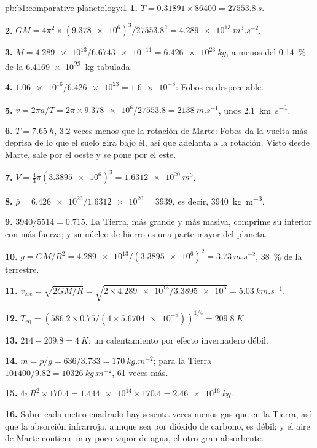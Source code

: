 \begin{solution}{pb:b1:comparative-planetology:1}
\textbf{1.} $T = 0.31891\times86400 = \qty{27553.8}{s}$.

\textbf{2.} $GM = 4\pi^2\times(\num{9.378e6})^3/\num{27553.8}^2 =
\qty{4.289e13}{m^3.s^{-2}}$.

\textbf{3.} $M = \num{4.289e13}/\num{6.6743e-11} = \qty{6.426e23}{kg}$,
a menos del \qty{0.14}{\percent} de la \qty{6.4169e23}{kg} tabulada.

\textbf{4.} $\num{1.06e16}/\num{6.426e23} = \num{1.6e-8}$: Fobos es despreciable.

\textbf{5.} $v = 2\pi a/T = 2\pi\times\num{9.378e6}/27553.8 =
\qty{2138}{m.s^{-1}}$, unos \qty{2.1}{km.s^{-1}}.

\textbf{6.} $T = \qty{7.65}{h}$, 3.2 veces menos que la rotación de Marte: Fobos da la vuelta
más deprisa de lo que el suelo gira bajo él, así que adelanta a la rotación. Visto desde Marte,
sale por el oeste y se pone por el este.

\textbf{7.} $V = \tfrac43\pi(\num{3.3895e6})^3 = \qty{1.6312e20}{m^3}$.

\textbf{8.} $\bar\rho = \num{6.426e23}/\num{1.6312e20} = 3939$, es decir,
\qty{3940}{kg.m^{-3}}.

\textbf{9.} $3940/5514 = 0.715$. La Tierra, más grande y más masiva, comprime su interior con
más fuerza; y su núcleo de hierro es una parte mayor del planeta.

\textbf{10.} $g = GM/R^2 = \num{4.289e13}/(\num{3.3895e6})^2 =
\qty{3.73}{m.s^{-2}}$, \qty{38}{\percent} de la terrestre.

\textbf{11.} $v_\mathrm{esc} = \sqrt{2GM/R} = \sqrt{2\times\num{4.289e13}/
\num{3.3895e6}} = \qty{5.03}{km.s^{-1}}$.

\textbf{12.} $T_\mathrm{eq} = (586.2\times0.75/(4\times\num{5.6704e-8}))^{1/4}
= \qty{209.8}{K}$.

\textbf{13.} $214 - 209.8 = \qty{4}{K}$: un calentamiento por efecto invernadero débil.

\textbf{14.} $m = p/g = 636/3.733 = \qty{170}{kg.m^{-2}}$; para la Tierra
$101400/9.82 = \qty{10326}{kg.m^{-2}}$, 61 veces más.

\textbf{15.} $4\pi R^2\times170.4 = \num{1.444e14}\times170.4 =
\qty{2.46e16}{kg}$.

\textbf{16.} Sobre cada metro cuadrado hay sesenta veces menos gas que en la Tierra, así que la
absorción infrarroja, aunque sea por dióxido de carbono, es débil; y el aire de Marte contiene
muy poco vapor de agua, el otro gran absorbente.


\end{solution}
